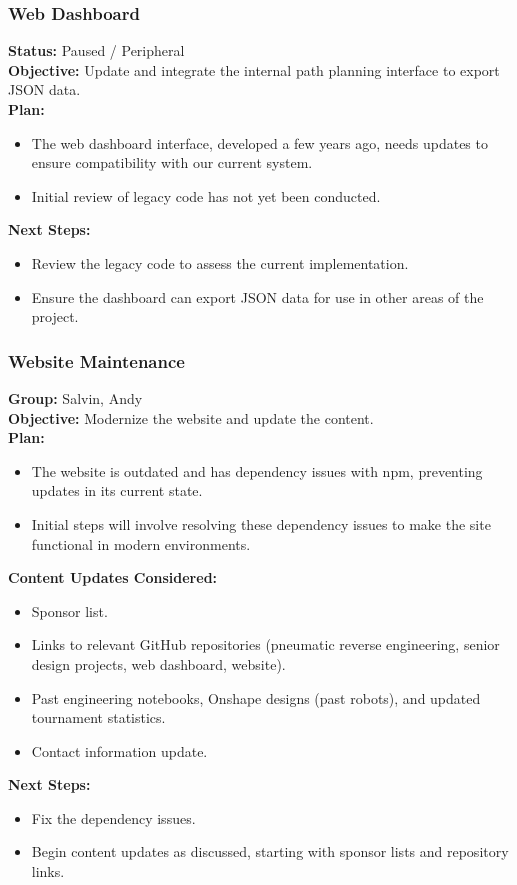\subsubsection{Web Dashboard}
\noindent
\textbf{Status:} Paused / Peripheral\\
\textbf{Objective:} Update and integrate the internal path planning interface to export JSON data.\\
\textbf{Plan:}
\begin{itemize}
  \item The web dashboard interface, developed a few years ago, needs updates to ensure compatibility with our current system.
  \item Initial review of legacy code has not yet been conducted.
\end{itemize}
\textbf{Next Steps:}
\begin{itemize}
  \item Review the legacy code to assess the current implementation.
  \item Ensure the dashboard can export JSON data for use in other areas of the project.
\end{itemize}

\subsubsection{Website Maintenance}
\noindent
\textbf{Group:} Salvin, Andy\\
\textbf{Objective:} Modernize the website and update the content.\\
\textbf{Plan:}
\begin{itemize}
  \item The website is outdated and has dependency issues with npm, preventing updates in its current state.
  \item Initial steps will involve resolving these dependency issues to make the site functional in modern environments.

\end{itemize}
\textbf{Content Updates Considered:}
\begin{itemize}
  \item Sponsor list.
  \item Links to relevant GitHub repositories (pneumatic reverse engineering, senior design projects, web dashboard, website).
  \item Past engineering notebooks, Onshape designs (past robots), and updated tournament statistics.
  \item Contact information update.
\end{itemize}
\textbf{Next Steps:}
\begin{itemize}
  \item Fix the dependency issues.
  \item Begin content updates as discussed, starting with sponsor lists and repository links.
\end{itemize}

